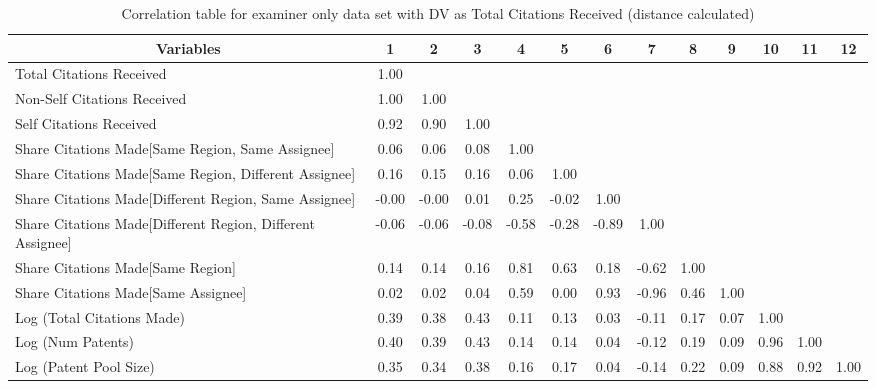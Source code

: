 \begin{table}[htbp]\centering \caption{Correlation table for examiner only data set with DV as Total Citations Received (distance calculated)\label{e.tcorrelation}}
\scriptsize
\singlespacing
\begin{adjustbox}{angle=90}
\begin{tabular}{l  c  c  c  c  c  c  c  c  c  c  c  c }\hline\hline
\multicolumn{1}{c}{Variables} &1&2&3&4&5&6&7&8&9&10&11&12\\ \hline
Total Citations Received&1.00\\
Non-Self Citations Received&1.00&1.00\\
Self Citations Received&0.92&0.90&1.00\\
Share Citations Made[Same Region, Same Assignee]&0.06&0.06&0.08&1.00\\
Share Citations Made[Same Region, Different Assignee]&0.16&0.15&0.16&0.06&1.00\\
Share Citations Made[Different Region, Same Assignee]&-0.00&-0.00&0.01&0.25&-0.02&1.00\\
Share Citations Made[Different Region, Different Assignee]&-0.06&-0.06&-0.08&-0.58&-0.28&-0.89&1.00\\
Share Citations Made[Same Region]&0.14&0.14&0.16&0.81&0.63&0.18&-0.62&1.00\\
Share Citations Made[Same Assignee]&0.02&0.02&0.04&0.59&0.00&0.93&-0.96&0.46&1.00\\
Log (Total Citations Made)&0.39&0.38&0.43&0.11&0.13&0.03&-0.11&0.17&0.07&1.00\\
Log (Num Patents)&0.40&0.39&0.43&0.14&0.14&0.04&-0.12&0.19&0.09&0.96&1.00\\
Log (Patent Pool Size)&0.35&0.34&0.38&0.16&0.17&0.04&-0.14&0.22&0.09&0.88&0.92&1.00\\
\hline \hline 
 \end{tabular}
 \end{adjustbox}
\end{table}
